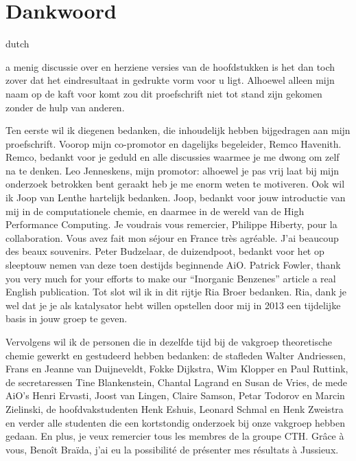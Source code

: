 \chapter*{Dankwoord}
\label{dankwoord}
\fancyhead[RO]{\thepage}
\fancyhead[LE]{\thepage}
\begin{otherlanguage*}{dutch}

\lettrine{}{}a menig discussie over en herziene versies van de hoofdstukken is het dan toch zover dat het eindresultaat in gedrukte vorm voor u ligt. Alhoewel alleen mijn naam op de kaft voor komt zou dit proefschrift niet tot stand zijn gekomen zonder de hulp van anderen.

Ten eerste wil ik diegenen bedanken, die inhoudelijk hebben bijgedragen aan mijn proefschrift. Voorop mijn co-promotor en dagelijks begeleider, Remco Havenith. Remco, bedankt voor je geduld en alle discussies waarmee je me dwong om zelf na te denken. Leo Jenneskens, mijn promotor: alhoewel je pas vrij laat bij mijn onderzoek betrokken bent geraakt heb je me enorm weten te motiveren. Ook wil ik Joop van Lenthe hartelijk bedanken. Joop, bedankt voor jouw introductie van mij in de computationele chemie, en daarmee in de wereld van de High Performance Computing. Je voudrais vous remercier, Philippe Hiberty, pour la collaboration. Vous avez fait mon s\'{e}jour en France tr\`{e}s agr\'{e}able. J'ai beaucoup des beaux souvenirs. Peter Budzelaar, de duizendpoot, bedankt voor het op sleeptouw nemen van deze toen destijds beginnende AiO. Patrick Fowler, thank you very much for your efforts to make our ``Inorganic Benzenes'' article a real English publication. Tot slot wil ik in dit rijtje Ria Broer bedanken. Ria, dank je wel dat je je als katalysator hebt willen opstellen door mij in 2013 een tijdelijke basis in jouw groep te geven.

Vervolgens wil ik de personen die in dezelfde tijd bij de vakgroep theoretische chemie gewerkt en gestudeerd hebben bedanken: de stafleden Walter Andriessen, Frans en Jeanne van Duijneveldt, Fokke Dijkstra, Wim Klopper en Paul Ruttink, de secretaressen Tine Blankenstein, Chantal Lagrand en Susan de Vries, de mede AiO's Henri Ervasti, Joost van Lingen, Claire Samson, Petar Todorov en Marcin Zielinski, de hoofdvakstudenten Henk Eshuis, Leonard Schmal en Henk Zweistra en verder alle studenten die een kortstondig onderzoek bij onze vakgroep hebben gedaan. En plus, je veux remercier tous les membres de la groupe CTH. Gr\^{a}ce \`{a} vous, Beno\^{i}t Bra\"{i}da, j'ai eu la possibilit\'{e} de pr\'{e}senter mes r\'{e}sultats \`{a} Jussieux.


\end{otherlanguage*}
